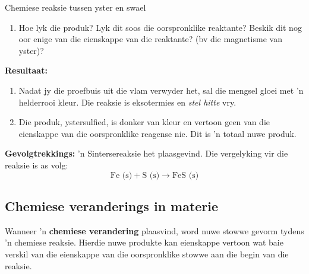 \begin{g_experiment}{Chemiese reaksie tussen yster en swael}
\begin{enumerate}[noitemsep, label=\textbf{\arabic*}. ]
\label{m38709*uid24}\item Hoe lyk die produk? Lyk dit soos die oorspronklike reaktante? Beskik dit nog oor enige van die eienskappe van
die reaktante? (bv die magnetisme van yster)?
\end{enumerate}
        \par 
        \label{m38709*eip-963}
	\par
      \label{m38709*id63554}\noindent{}\textbf{Resultaat:}
          \newline
        \label{m38709*id63560}\begin{enumerate}[noitemsep, label=\textbf{\arabic*}. ] 
            \label{m38709*uid25}\item Nadat jy die proefbuis uit die vlam verwyder het, sal die mengsel gloei met 'n helderrooi kleur. Die reaksie is
eksotermies en \textsl{stel hitte} vry.
\label{m38709*uid26}\item Die produk, ystersulfied, is donker van kleur en vertoon geen van die eienskappe van die oorspronklike reagense nie. Dit is 'n totaal nuwe produk.
\end{enumerate}
        \par 
        \label{m38709*id63594}\noindent{}\textbf{Gevolgtrekkings:}
          \newline
 'n Sintersereaksie het plaasgevind. Die vergelyking vir die reaksie is as volg:
        \label{m38709*id63604}\nopagebreak\noindent{}
    \begin{equation*}
    \text{Fe (s)}+\text{S (s)}\to \text{FeS (s)}
      \end{equation*} 
\end{g_experiment}
    \label{m38709*cid3}
            \subsection*{Chemiese veranderings in materie}
            \nopagebreak
      \label{m38709*id62778}Wanneer 'n \textbf{chemiese verandering} plaasvind, word nuwe stowwe gevorm tydens 'n chemiese reaksie. Hierdie nuwe produkte kan eienskappe vertoon wat baie verskil van die eienskappe van die oorspronklike stowwe aan die begin van die reaksie.\par 
            


